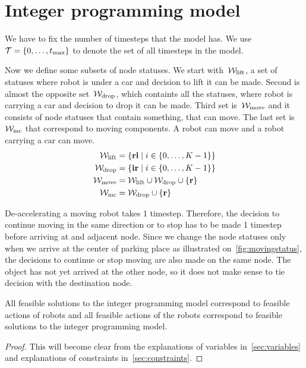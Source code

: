 \section{Integer programming model}
We have to fix the number of timesteps that the model has. We use $\mathcal{T} =
\{0,\ldots,t_{\max}\}$ to denote the set of all timesteps in the model.

Now we define some subsets of node statuses. We start with~$\mathcal{W}_\mathrm{lift}$, a set of
statuses where robot is under a car and decision to lift it can be made. Second
is almost the opposite set~$\mathcal{W}_\mathrm{drop}$, which containts all the statuses, where robot
is carrying a car and decision to drop it can be made. Third set is~$\mathcal{W}_\mathrm{move}$ and
it consists of node statuses that contain something, that can move. The last
set is~$\mathcal{W}_\mathrm{mc}$ that correspond to moving components. A robot can move and a
robot carrying a car can move.
\begin{align}
    \mathcal{W}_\mathrm{lift} &= \{\text{\bf ri} \mid i \in \{0,\ldots,K-1\}\}\\
    \mathcal{W}_\mathrm{drop} &= \{\text{\bf ir} \mid i \in \{0,\ldots,K-1\}\}\\
    \mathcal{W}_\mathrm{move} &= \mathcal{W}_\mathrm{lift} \cup \mathcal{W}_\mathrm{drop} \cup \{\text{\bf r}\}\\
    \mathcal{W}_\mathrm{mc} &= \mathcal{W}_\mathrm{drop} \cup \{\text{\bf r}\}
\end{align}

De-accelerating a moving robot takes 1 timestep. Therefore, the decision to continue
moving in the same direction or to stop has to be made 1 timestep before
arriving at and adjacent node. Since we change the node statuses only when we
arrive at the center of parking place as illustrated
on~\autoref{fig:movingstatus}, the decisions to continue or stop moving are
also made on the same node. The object has not yet arrived at the other node,
so it does not make sense to tie decision with the destination node.

\begin{lemma}
    All feasible solutions to the integer programming model correspond to feasible
    actions of robots and all feasible actions of the robots correspond to
    feasible solutions to the integer programming model.
\end{lemma}
\begin{proof}
    This will become clear from the explanations of variables
    in~\autoref{sec:variables} and explanations of constraints
    in~\autoref{sec:constraints}.
\end{proof}
